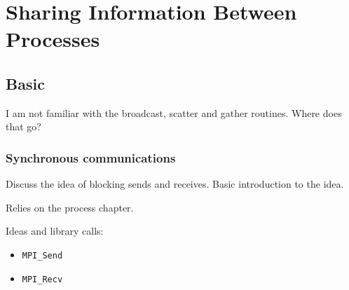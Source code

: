 \chapter{Sharing Information Between Processes}

\section{Basic}

I am not familiar with the broadcast, scatter and gather
routines. Where does that go?

\subsection{Synchronous communications}

\todo Discuss the idea of blocking sends and receives. Basic introduction to
the idea.

\todo Relies on the process chapter.

Ideas and library calls: \\
\begin{itemize}
\item \texttt{MPI\_Send}
\item \texttt{MPI\_Recv}
\end{itemize}

